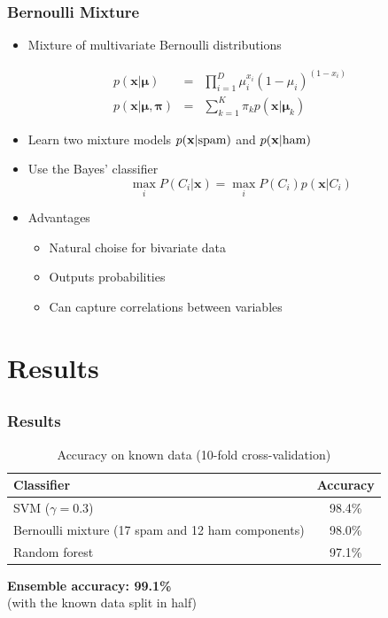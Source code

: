 \documentclass{beamer}
\begin{document}
\frame
{
  \frametitle{Bernoulli Mixture}

  \begin{itemize}
    \item Mixture of multivariate Bernoulli distributions
  \end{itemize}
  \begin{eqnarray*}
    p(\mathbf{x}|\boldsymbol\mu) &=& \prod_{i=1}^D \mu_i^{x_i}(1-\mu_i)^{(1-x_i)} \\
    p(\mathbf{x}|\boldsymbol\mu,\boldsymbol\pi) &=& \sum_{k=1}^K \pi_kp(\mathbf{x}|\boldsymbol\mu_k)
  \end{eqnarray*}
  \begin{itemize}
  \item Learn two mixture models $p(\mathbf{x}|\textmd{spam})$ and $p(\mathbf{x}|\textmd{ham})$
  \item Use the Bayes' classifier 
  \begin{equation}
  \max_i P(C_i|\mathbf{x}) = \max_i P(C_i)p(\mathbf{x}|C_i)
  \end{equation}
  \item Advantages
  \begin{itemize}
    \item Natural choise for bivariate data
    \item Outputs probabilities
    \item Can capture correlations between variables
  \end{itemize}
  \end{itemize}

}

\section{Results}
\subsection{}
\frame
{
  \frametitle{Results}

{\scriptsize
\begin{table}
\hspace{1.0cm}
\caption{Accuracy on known data (10-fold cross-validation)}
\begin{tabular}{l|c}
Classifier & Accuracy \\ \hline
SVM ($\gamma = 0.3$) & 98.4\% \\
Bernoulli mixture (17 spam and 12 ham components) & 98.0\% \\
Random forest & 97.1\% \\
\end{tabular}
\end{table}
}
\hspace{1.0cm}

{\bf Ensemble accuracy: 99.1\%} \\
(with the known data split in half)
}
\end{document}
